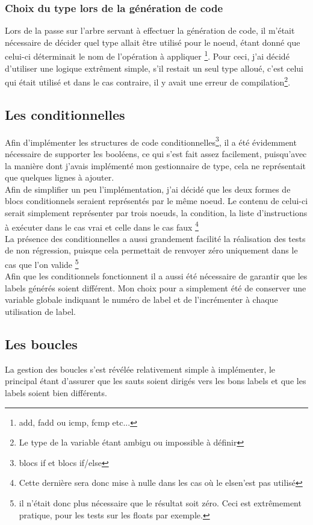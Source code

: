 \documentclass[12pt]{article}
\begin{document}
\subsubsection{Choix du type lors de la génération de code}
Lors de la passe sur l'arbre servant à effectuer la génération de code,
il m'était nécessaire de décider quel type allait être utilisé pour le noeud,
étant donné que celui-ci déterminait le nom de l'opération à appliquer
\footnote{add, fadd ou icmp, fcmp etc...}. Pour ceci, j'ai décidé d'utiliser
une logique extrêment simple, s'il restait un seul type alloué, c'est celui
qui était utilisé et dans le cas contraire, il y avait une erreur de
compilation\footnote{Le type de la variable étant ambigu ou impossible
à définir}.

\subsection{Les conditionnelles}
Afin d'implémenter les structures de code conditionnelles\footnote{blocs if
et blocs if/else}, il a été évidemment nécessaire de supporter les booléens,
ce qui s'est fait assez facilement, puisqu'avec la manière dont j'avais
implémenté mon gestionnaire de type, cela ne représentait que quelques lignes
à ajouter.\\

Afin de simplifier un peu l'implémentation, j'ai décidé que les deux formes
de blocs conditionnels seraient représentés par le même noeud. Le contenu de
celui-ci serait simplement représenter par trois noeuds, la condition, la
liste d'instructions à exécuter dans le cas vrai et celle dans le cas faux
\footnote{Cette dernière sera donc mise à nulle dans les cas où le elsen'est
pas utilisé}\\

La présence des conditionnelles a aussi grandement facilité la réalisation
des tests de non régression, puisque cela permettait de renvoyer zéro
uniquement dans le cas que l'on valide \footnote{il n'était donc plus
nécessaire que le résultat soit zéro. Ceci est extrêmement pratique, pour les
tests sur les floats par exemple.}\\

Afin que les conditionnels fonctionnent il a aussi été nécessaire de garantir
que les labels générés soient différent. Mon choix pour a simplement été
de conserver une variable globale indiquant le numéro de label et de
l'incrémenter à chaque utilisation de label.

\subsection{Les boucles}
La gestion des boucles s'est révélée relativement simple à implémenter,
le principal étant d'assurer que les sauts soient dirigés vers les bons
labels et que les labels soient bien différents.
\end{document}
